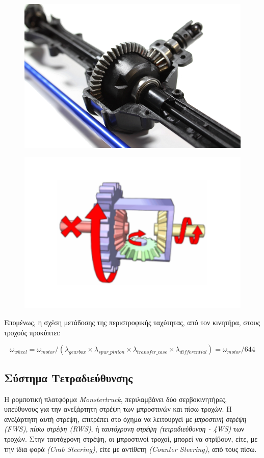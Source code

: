 \begin{figure}[!ht]
	\begin{minipage}{.49\textwidth}
		\centering
		\includegraphics[width=0.5\linewidth]{Chapters/Chapter2/Figures/differential.png}
		\label{fig:differential}
	\end{minipage}
	\begin{minipage}{.5\textwidth}
	 	\centering		
		\includegraphics[width=0.5\linewidth]		
			{Chapters/Chapter2/Figures/differential_function.png}
		\label{fig:differential_function}
	\end{minipage}
\end{figure}

\bigskip
Επομένως, η σχέση μετάδοσης της περιστροφικής ταχύτητας, από τον κινητήρα, στους τροχούς προκύπτει:

\begin{equation}
	\omega_{wheel} = \omega_{motor} / (\lambda_{gearbox} \times \lambda_{spur\_pinion} \times \lambda_{transfer\_case} \times \lambda_{differential}) = \omega_{motor} / 644
\end{equation}

\bigskip
\subsection{Σύστημα Τετραδιεύθυνσης}
Η ρομποτική πλατφόρμα \textit{Monstertruck}, περιλαμβάνει δύο σερβοκινητήρες, υπεύθυνους για την ανεξάρτητη στρέψη των μπροστινών και πίσω τροχών. Η ανεξάρτητη αυτή στρέψη, επιτρέπει στο όχημα να λειτουργεί με \textit{μπροστινή στρέψη (FWS)}, \textit{πίσω στρέψη (RWS)}, ή \textit{ταυτόχρονη στρέψη (τετραδιεύθυνση - 4WS)} των τροχών. Στην ταυτόχρονη στρέψη, οι μπροστινοί τροχοί, μπορεί να στρίβουν, είτε, με την ίδια φορά \textit{(Crab Steering)}, είτε με αντίθετη \textit{(Counter Steering)}, από τους πίσω.

